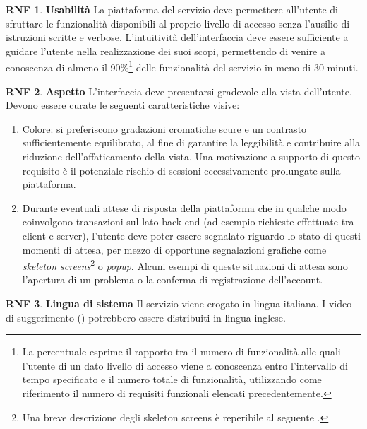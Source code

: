 \documentclass[11pt, a4paper]{article}
\theoremstyle{definition}
\newtheorem{nonfuncreq}{RNF} %
\begin{document}
\begin{nonfuncreq}
\textbf{Usabilità }
La piattaforma del servizio deve permettere all'utente di sfruttare le
funzionalità disponibili al proprio livello di accesso senza l'ausilio di
istruzioni scritte e verbose. L'intuitività dell'interfaccia deve essere
sufficiente a guidare l'utente nella realizzazione dei suoi scopi,
permettendo di venire a conoscenza di almeno il 90\%\footnote{La percentuale
esprime il rapporto tra il numero di funzionalità alle quali l'utente di un
dato livello di accesso viene a conoscenza entro l'intervallo di tempo specificato
e il numero totale di funzionalità, utilizzando come riferimento il
numero di requisiti funzionali elencati precedentemente.} delle funzionalità
del servizio in meno di 30 minuti.
\end{nonfuncreq}

\begin{nonfuncreq}
\textbf{Aspetto } L'interfaccia deve presentarsi gradevole alla vista dell'utente.
Devono essere curate le seguenti caratteristiche visive:
\begin{enumerate}
    \item Colore: si preferiscono gradazioni cromatiche scure e un contrasto
    sufficientemente equilibrato, al fine di garantire la leggibilità e
    contribuire alla riduzione dell'affaticamento della vista. Una motivazione
    a supporto di questo requisito è il potenziale rischio di sessioni eccessivamente
    prolungate sulla piattaforma.

    \item Durante eventuali attese di risposta della piattaforma che
    in qualche modo coinvolgono transazioni sul lato back-end (ad esempio
    richieste effettuate tra client e server), l'utente deve poter
    essere segnalato riguardo lo stato di questi momenti di attesa,
    per mezzo di opportune segnalazioni grafiche come \textit{skeleton
    screens}\footnote{Una breve descrizione degli skeleton screens è
    reperibile al seguente \href{https://www.nngroup.com/articles/skeleton-screens/}{\textcolor{blue}{}}.}
    o \textit{popup}. Alcuni esempi di queste situazioni di attesa sono
    l'apertura di un problema o la conferma di registrazione dell'account.
\end{enumerate}
\end{nonfuncreq}

\begin{nonfuncreq}
\textbf{Lingua di sistema }
Il servizio viene erogato in lingua italiana. I video di suggerimento
(\textcolor{blue}{})
potrebbero essere distribuiti in lingua inglese.
\end{nonfuncreq}
\end{document}
